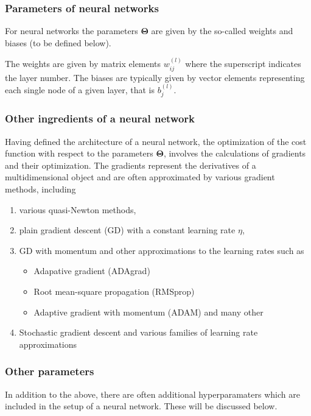\documentclass{beamer}
\begin{document}
\begin{frame}
\frametitle{Parameters of neural networks}

For neural networks the parameters
$\bm{\Theta}$ are given by the so-called weights and biases (to be
defined below).

The weights are given by matrix elements $w_{ij}^{(l)}$ where the
superscript indicates the layer number. The biases are typically given
by vector elements representing each single node of a given layer,
that is $b_j^{(l)}$.
\end{frame}

\begin{frame}
\frametitle{Other ingredients of a neural network}

Having defined the architecture of a neural network, the optimization
of the cost function with respect to the parameters $\bm{\Theta}$,
involves the calculations of gradients and their optimization. The
gradients represent the derivatives of a multidimensional object and
are often approximated by various gradient methods, including
\begin{enumerate}
\item various quasi-Newton methods,

\item plain gradient descent (GD) with a constant learning rate $\eta$,

\item GD with momentum and other approximations to the learning rates such as
\begin{itemize}

  \item Adapative gradient (ADAgrad)

  \item Root mean-square propagation (RMSprop)

  \item Adaptive gradient with momentum (ADAM) and many other

\end{itemize}

\noindent
\item Stochastic gradient descent and various families of learning rate approximations
\end{enumerate}

\noindent
\end{frame}

\begin{frame}
\frametitle{Other parameters}

In addition to the above, there are often additional hyperparamaters
which are included in the setup of a neural network. These will be
discussed below.
\end{frame}
\end{document}
